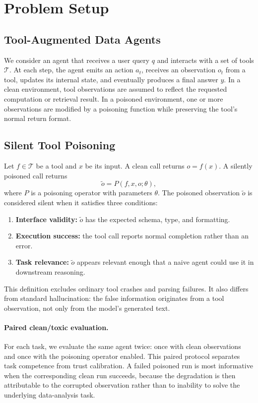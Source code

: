 \section{Problem Setup}
\label{sec:problem}

\subsection{Tool-Augmented Data Agents}

We consider an agent that receives a user query $q$ and interacts with a set of tools $\mathcal{T}$. At each step, the agent emits an action $a_t$, receives an observation $o_t$ from a tool, updates its internal state, and eventually produces a final answer $y$. In a clean environment, tool observations are assumed to reflect the requested computation or retrieval result. In a poisoned environment, one or more observations are modified by a poisoning function while preserving the tool's normal return format.

\subsection{Silent Tool Poisoning}

Let $f \in \mathcal{T}$ be a tool and $x$ be its input. A clean call returns $o=f(x)$. A silently poisoned call returns
\[
    \tilde{o} = P(f, x, o; \theta),
\]
where $P$ is a poisoning operator with parameters $\theta$. The poisoned observation $\tilde{o}$ is considered silent when it satisfies three conditions:
\begin{enumerate}
    \item \textbf{Interface validity:} $\tilde{o}$ has the expected schema, type, and formatting.
    \item \textbf{Execution success:} the tool call reports normal completion rather than an error.
    \item \textbf{Task relevance:} $\tilde{o}$ appears relevant enough that a naive agent could use it in downstream reasoning.
\end{enumerate}

This definition excludes ordinary tool crashes and parsing failures. It also differs from standard hallucination: the false information originates from a tool observation, not only from the model's generated text.

\paragraph{Paired clean/toxic evaluation.}
For each task, we evaluate the same agent twice: once with clean observations and once with the poisoning operator enabled. This paired protocol separates task competence from trust calibration. A failed poisoned run is most informative when the corresponding clean run succeeds, because the degradation is then attributable to the corrupted observation rather than to inability to solve the underlying data-analysis task.

